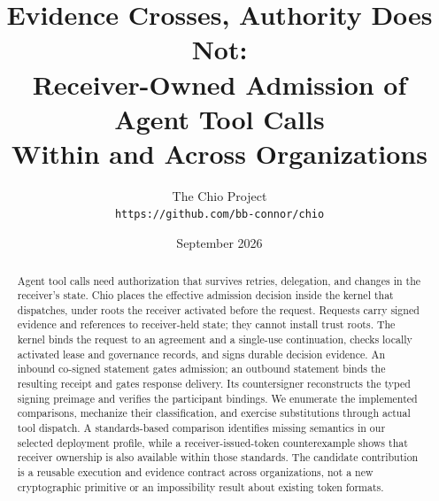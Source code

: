 \documentclass[10pt,letterpaper,onecolumn]{article}
\title{\vspace{-3em}Evidence Crosses, Authority Does Not:\\
Receiver-Owned Admission of Agent Tool Calls\\
Within and Across Organizations}
\author{The Chio Project\\
\small\texttt{https://github.com/bb-connor/chio}}
\date{\vspace{-0.5em}September 2026}
\begin{document}
\maketitle

\begin{abstract}
\noindent
Agent tool calls need authorization that survives retries, delegation, and
changes in the receiver's state. Chio places the effective admission decision
inside the kernel that dispatches, under roots the receiver activated before
the request. Requests carry signed evidence and references to receiver-held
state; they cannot install trust roots. The kernel binds the request to an
agreement and a single-use continuation, checks locally activated lease and
governance records, and signs durable decision evidence. An inbound co-signed
statement gates admission; an outbound statement binds the resulting receipt
and gates response delivery. Its countersigner reconstructs the typed signing
preimage and verifies the participant bindings. We enumerate the implemented
comparisons, mechanize their classification, and exercise substitutions through
actual tool dispatch. A standards-based comparison identifies missing semantics
in our selected deployment profile, while a receiver-issued-token counterexample
shows that receiver ownership is also available within those standards. The
candidate contribution is a reusable execution and evidence contract across
organizations, not a new cryptographic primitive or an impossibility result
about existing token formats.
\end{abstract}











{\scriptsize\linespread{0.93}\selectfont
\setlength{\bibsep}{0.3pt plus 0.2ex}

}
\end{document}
